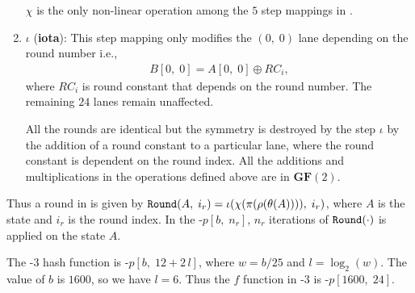 \begin{enumerate}
    $\chi$ is the only non-linear operation among the $5$ step mappings in \KECCAK{}.
    
    \vskip5pt
    \item $\iota$ ({\bf iota}): This step mapping only modifies the $(0,\;0)$ lane depending on the round number i.e., 
    \begin{align}
       B[0,\; 0] = A[0,\; 0] \oplus RC_i,
   \end{align}
    where $RC_i$ is round constant that depends on the round number. The remaining $24$ lanes remain unaffected.
    
    All the rounds are identical but the symmetry is destroyed by the step $\iota$ by the addition of a round constant to a particular lane, where the round constant is dependent on the round index.
    All the additions and multiplications in the operations defined above are in $\textbf{GF}(2)$.
\end{enumerate}
Thus a round in \Keccak{} is given by ${\tt Round}(A,\; i_r) = \iota( \chi( \pi ( \rho ( \theta ( A ) ) ) ),\; i_r)$, where $A$ is the state and $i_r$ is the round index. In the \Keccak-$p[b,\; n_r]$, $n_r$ iterations of ${\tt Round}(\cdot)$ is applied on the state $A$.

The \SHA-$3$ hash function is \Keccak-$p[b,\; 12 + 2\,l]$, where $w = b/25$ and $l = \log_{2}(w)$. The value of $b$ is $1600$, so we have $l = 6$. Thus the $f$ function in \SHA-$3$ is \Keccak-$p[1600,\; 24]$.

